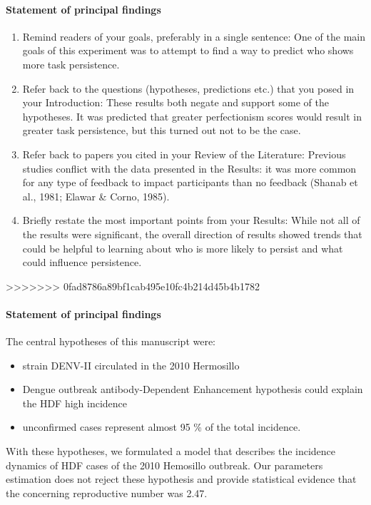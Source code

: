 	\paragraph{Statement of principal findings}
	\begin{enumerate}
		\item
			Remind readers of your goals, preferably in a single sentence:
			One of the main goals of this experiment was to attempt
			 to find a way to predict who shows more task persistence.
		\item
			Refer back to the questions (hypotheses, predictions etc.) 
			that you posed in your Introduction:
			These results both negate and support some of the hypotheses.
			It was predicted that greater perfectionism scores would result
			in greater task persistence, but this turned out not to be
			the case.
		\item
			Refer back to papers you cited in your Review of the Literature:
			Previous studies conflict with the data presented in the Results: 
			it was more common for any type of feedback to impact participants 
			than no feedback (Shanab et al., 1981; Elawar \&  Corno, 1985).
		\item
			Briefly restate the most important points from your Results:
			While not all of the results were significant, 
			the overall direction of results showed trends 
			that could be helpful to learning about who is more 
			likely to persist and what could influence persistence.
	\end{enumerate}
>>>>>>> 0fad8786a89bf1cab495e10fc4b214d45b4b1782

    \paragraph{Statement of principal findings}
        The central hypotheses of this manuscript were:
        \begin{itemize}
            \item
                strain DENV-II circulated in the 2010 Hermosillo 
            \item
                Dengue outbreak antibody-Dependent Enhancement hypothesis
                could explain the HDF high incidence 
            \item
                unconfirmed cases represent almost 95 \% of the total
                incidence.
        \end{itemize}
    With these hypotheses, we formulated a model that describes
    the incidence dynamics of HDF cases of the 2010 Hemosillo outbreak.
    Our parameters estimation does not reject these hypothesis and provide
    statistical evidence that the concerning reproductive number was 2.47.
    


